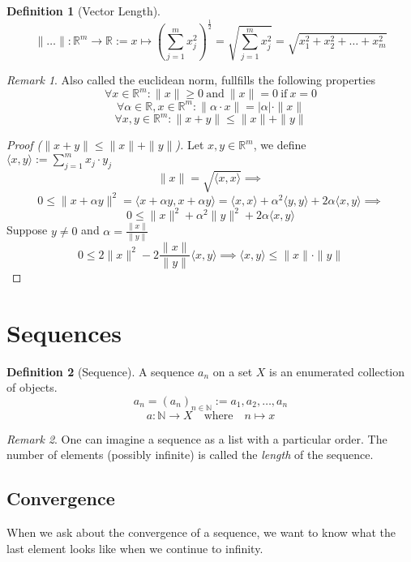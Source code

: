 \documentclass[english,titlepage]{uzhpub}
\theoremstyle{definition}
\newtheorem{definition}{Definition}[section]
\theoremstyle{plain}
\theoremstyle{remark}
\newtheorem*{remark}{Remark}
\theoremstyle{example}
\begin{document}
   \begin{definition}[Vector Length]
      \[\|\ldots\|: \mathbb{R}^m \to \mathbb{R} := x \mapsto \left(\sum_{j=1}^m x_j^2\right)^{\frac{1}{2}} = \sqrt{\sum_{j=1}^m x_j^2} = \sqrt{x_1^2 + x_2^2 + \ldots + x_m^2}\]
   \end{definition}
   \begin{remark}
      Also called the euclidean norm, fullfills the following properties
      \[\forall x \in \mathbb{R}^m: \|x\| \geq 0~\text{and}~\|x\| = 0~\text{if}~x = 0\]
      \[\forall \alpha \in \mathbb{R}, x \in \mathbb{R}^m: \|\alpha \cdot x\| = |\alpha| \cdot \|x\|\]
      \[\forall x, y \in \mathbb{R}^m: \|x + y\| \leq \|x\| + \|y\|\]
   \end{remark}
   \begin{proof}[Proof (\(\|x + y\| \leq \|x\| + \|y\|\))]
      Let \(x, y \in \mathbb{R}^m\), we define \(\langle x, y \rangle := \sum_{j=1}^m x_j \cdot y_j\)
      \[\|x\| = \sqrt{\langle x, x \rangle} \implies\]
      \[0 \leq \|x + \alpha y\|^2 = \langle x + \alpha y, x + \alpha y \rangle = \langle x, x \rangle + \alpha^2 \langle y, y \rangle + 2 \alpha \langle x, y\rangle \implies\]
      \[0 \leq \|x\|^2 + \alpha^2 \|y\|^2 + 2 \alpha \langle x, y \rangle\]
      Suppose \(y \neq 0\) and \(\alpha = \frac{\|x\|}{\|y\|}\)
      \[0 \leq 2 \|x\|^2 - 2\frac{\|x\|}{\|y\|} \langle x, y \rangle \implies \langle x, y \rangle \leq \|x\| \cdot \|y\|\]
   \end{proof}

   \section{Sequences}
   \begin{definition}[Sequence]
      A sequence \(a_n\) on a set \(X\) is an enumerated collection of objects.
      \[a_n = (a_n)_{n \in \mathbb{N}} := a_1, a_2, \ldots, a_n\]
      \[a: \mathbb{N} \to X \quad\text{where}\quad n \mapsto x\]
   \end{definition}
   \begin{remark}
      One can imagine a sequence as a list with a particular order.
      The number of elements (possibly infinite) is called the \textit{length} of the sequence.
   \end{remark}

   \subsection{Convergence}
   When we ask about the convergence of a sequence, we want to know what the last element looks like when we continue to infinity.
\end{document}

